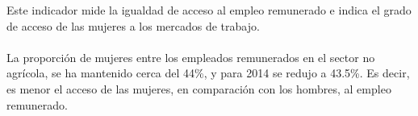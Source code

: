 Este indicador mide la igualdad de acceso al empleo remunerado e indica el grado de acceso de las mujeres a los mercados de trabajo. \\\\
La proporción de mujeres entre los empleados remunerados en el sector no agrícola, se ha mantenido cerca del 44\%, y para 2014 se redujo  a 43.5\%. Es decir, es menor el acceso de las mujeres, en comparación con los hombres, al empleo remunerado.